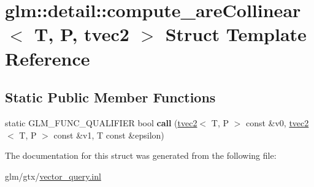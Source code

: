 \hypertarget{structglm_1_1detail_1_1compute__areCollinear_3_01T_00_01P_00_01tvec2_01_4}{\section{glm\-:\-:detail\-:\-:compute\-\_\-are\-Collinear$<$ T, P, tvec2 $>$ Struct Template Reference}
\label{structglm_1_1detail_1_1compute__areCollinear_3_01T_00_01P_00_01tvec2_01_4}
}
\subsection*{Static Public Member Functions}
\begin{DoxyCompactItemize}
\item 
\hypertarget{structglm_1_1detail_1_1compute__areCollinear_3_01T_00_01P_00_01tvec2_01_4_acec3b10a2cf7e270c961f64e8d68de5c}{static G\-L\-M\-\_\-\-F\-U\-N\-C\-\_\-\-Q\-U\-A\-L\-I\-F\-I\-E\-R bool {\bfseries call} (\hyperlink{structglm_1_1tvec2}{tvec2}$<$ T, P $>$ const \&v0, \hyperlink{structglm_1_1tvec2}{tvec2}$<$ T, P $>$ const \&v1, T const \&epsilon)}\label{structglm_1_1detail_1_1compute__areCollinear_3_01T_00_01P_00_01tvec2_01_4_acec3b10a2cf7e270c961f64e8d68de5c}

\end{DoxyCompactItemize}


The documentation for this struct was generated from the following file\-:\begin{DoxyCompactItemize}
\item 
glm/gtx/\hyperlink{vector__query_8inl}{vector\-\_\-query.\-inl}\end{DoxyCompactItemize}
